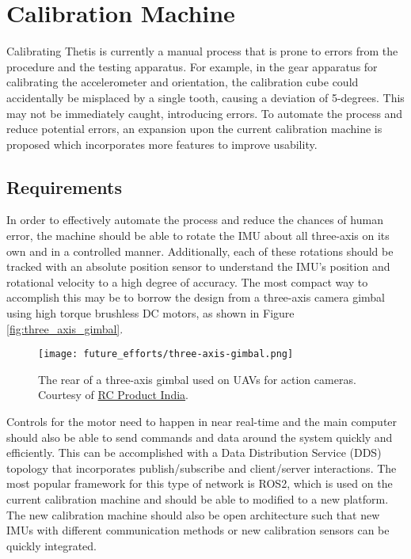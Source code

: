 \section{Calibration Machine} 
Calibrating Thetis is currently a manual process that is prone to errors from the procedure and the testing apparatus.
For example, in the gear apparatus for calibrating the accelerometer and orientation, the calibration cube could accidentally be misplaced by a single tooth, causing a deviation of 5-degrees.
This may not be immediately caught, introducing errors.
To automate the process and reduce potential errors, an expansion upon the current calibration machine is proposed which incorporates more features to improve usability.

\subsection{Requirements} 
In order to effectively automate the process and reduce the chances of human error, the machine should be able to rotate the IMU about all three-axis on its own and in a controlled manner.
Additionally, each of these rotations should be tracked with an absolute position sensor to understand the IMU's position and rotational velocity to a high degree of accuracy.
The most compact way to accomplish this may be to borrow the design from a three-axis camera gimbal using high torque brushless DC motors, as shown in Figure \ref{fig:three_axis_gimbal}.

\begin{figure}
    \centering
    \caption[Three Axis Gimbal]{The rear of a three-axis gimbal used on UAVs for action cameras. 
    Courtesy of \href{https://www.rcproduct.in/product/feiyutech-oem-sftuav-mini-3d-3-axis-gimbal/}{RC Product India}.}
    \texttt{[image: future\_efforts/three-axis-gimbal.png]}
\end{figure}

Controls for the motor need to happen in near real-time and the main computer should also be able to send commands and data around the system quickly and efficiently.
This can be accomplished with a Data Distribution Service (DDS) topology that incorporates publish/subscribe and client/server interactions.
The most popular framework for this type of network is ROS2, which is used on the current calibration machine and should be able to modified to a new platform.
The new calibration machine should also be open architecture such that new IMUs with different communication methods or new calibration sensors can be quickly integrated.

